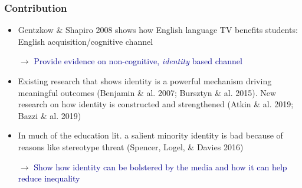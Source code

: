 \documentclass{beamer}
\begin{document}
\begin{frame}
\frametitle{Contribution}
\begin{itemize}

\item Gentzkow \& Shapiro 2008 shows how English language TV benefits students: English acquisition/cognitive channel

\item[$\rightarrow $] \textcolor{darkblue}{Provide evidence on non-cognitive, \textit{identity} based channel}


%


\pause

\item Existing research that shows identity is a powerful mechanism driving meaningful outcomes {\footnotesize (Benjamin \& al. 2007; Bursztyn \& al. 2015)}. New research on how identity is constructed and strengthened {\footnotesize (Atkin \& al. 2019; Bazzi \& al. 2019)}

\item In much of the education lit. a salient minority identity is bad because of reasons like stereotype threat {\footnotesize (Spencer, Logel, \& Davies 2016)}

\item[$\rightarrow $] \textcolor{darkblue}{Show how identity can be bolstered by the media and how it can help reduce inequality}\\ 

\end{itemize}

\end{frame}

\end{document}
